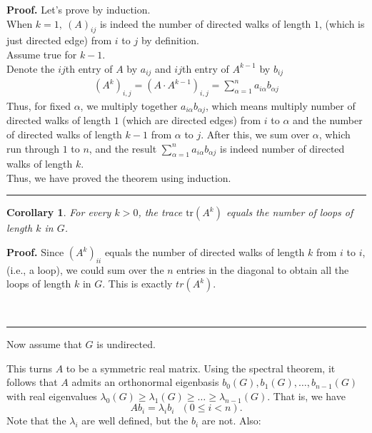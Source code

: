 \documentclass[12pt]{article}
\newtheorem{corollary}[theorem]{Corollary}
\newenvironment{proof}[1][Proof]{\textbf{#1.} }{\ \rule{0.5em}{0.5em}}
\begin{document}
\begin{proof}
    Let's prove by induction.\\
    When $k=1, \ (A)_{ij}$ is indeed the number of
    directed walks of length $1$,
    (which is just directed edge) from $i$ to $j$ by definition.\\
    Assume true for $k-1$.\\
    Denote the $ij$th entry of $A$ by $a_{ij}$ and $ij$th 
    entry of $A^{k-1}$ by $b_{ij}$
    \begin{align}
        (A^k)_{i,j} = (A \cdot A^{k-1})_{i,j} = \sum_{\alpha = 1}^{n} a_{i \alpha} b_{\alpha j}
    \end{align}
    Thus, for fixed $\alpha$, we multiply together $a_{i \alpha} b_{\alpha j}$,
    which means multiply number of directed walks of length $1$
    (which are directed edges) from $i$ to $\alpha$ and the 
    number of directed walks of length $k-1$ from $\alpha$ to $j$.
    After this, we sum over $\alpha$, which run through $1$ to $n$,
    and the result $\sum_{\alpha = 1}^{n} a_{i \alpha} b_{\alpha j}$
    is indeed number of directed walks of length $k$.\\
    Thus, we have proved the theorem using induction.
\end{proof}


\begin{corollary}
For every $k>0$, the trace $\mathrm{tr}(A^{k})$ equals the number of loops
of length $k$ in $G$.
\end{corollary}

\begin{proof}
    Since $(A^k)_{ii}$ equals the number of directed walks
    of length $k$ from $i$ to $i$, (i.e., a loop),
    we could sum over the $n$ entries in the diagonal
    to obtain all the loops of length $k$ in $G$.
    This is exactly $tr (A^k)$.
    
\end{proof}


Now assume that $G$ is undirected.

This turns $A$ to be a symmetric real matrix. Using the spectral theorem, it
follows that $A$ admits an orthonormal eigenbasis $b_{0}(G),b_{1}(G),%
\ldots,b_{n-1}(G)$ with real eigenvalues $\lambda_{0}(G)\geq\lambda
_{1}(G)\geq\ldots\geq\lambda_{n-1}(G)$. That is, we have 
\begin{equation*}
Ab_{i}=\lambda_{i}b_{i}\text{ \ }(0\leq i<n). 
\end{equation*}
Note that the $\lambda_{i}$ are well defined, but the $b_{i}$ are not. Also:
\end{document}
